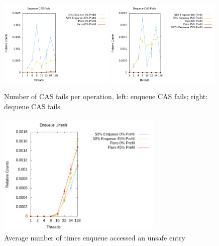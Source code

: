 \documentclass{article}      %
\begin{document}
\begin{figure}[H]
	\centering
	\includegraphics[width=0.49\textwidth]{Pictures/diss_enq_cas_red.png}
	\includegraphics[width=0.49\textwidth]{Pictures/diss_deq_cas_red.png}
	\caption{Number of CAS fails per operation, left: enqueue CAS fails; right: dequeue CAS fails}
	\label{fig:diss_red_cas_fails}
\end{figure}

\begin{figure}[H]
	\centering
	\includegraphics[width=0.7\textwidth]{Pictures/diss_enq_unsafe_red.png}
	\caption{Average number of times enqueue accessed an unsafe entry}
	\label{fig:diss_red_enq_unsafe}
\end{figure}
\end{document}
